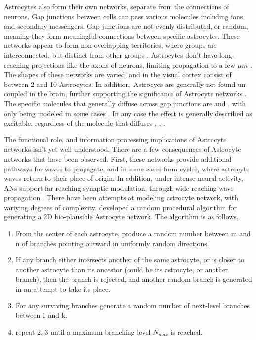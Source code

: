     Astrocytes also form their own networks, separate from the connections of
    neurons. Gap junctions between cells can pass various molecules including
    ions and secondary messengers. Gap junctions are not evenly distributed, or
    random, meaning they form meaningful connections between specific
    astrocytes. These networks appear to form non-overlapping territories, where
    groups are interconnected, but distinct from other
    groups \cite{mederos_2018}. Astrocytes don't have long-reaching
    projections like the axons of neurons, limiting \ca propagation to a few
    $\mu m$ \cite{hofer_2002}. The shapes of these networks are varied,
    and in the visual cortex consist of between 2 and 10 Astrocytes. In
    addition, Astrocyes are generally not found un-coupled in the brain, further
    supporting the significance of Astrocyte networks \cite{postnov_2009}. The
    specific molecules that generally diffuse across gap junctions are \ipt and
    \ca, with only \ipt being modeled in some cases \cite{pitta_2012}. In any
    case the effect is generally described as excitable, regardless of the
    molecule that diffuses \cite{gordleeva_2021}, \cite{pitta_2012},
    \cite{postnov_2009}.

    The functional role, and information processing implications of Astrocyte
    networks isn't yet well understood. There are a few consequences of
    Astrocyte networks that have been observed. First, these
    networks provide additional pathways for \ca waves to propagate, and in
    some cases form cycles, where astrocyte waves return to their place of
    origin. In addition, under intense neural activity, ANs support far reaching
    synaptic modulation, through wide reaching \ca wave propagation \cite{postnov_2009}. There have been attempts at
    modeling astrocyte network, with variying degrees of
    complexity. \parencite{postnov_2009} developed a random procedural algorithm for
    generating a 2D bio-plausible Astrocyte network. The algorithm is as follows,

    \begin{enumerate}
        \item From the center of each astrocyte, produce a random number between
          m and n of branches pointing outward in uniformly random directions.
        \item If any branch either intersects another of the same astrocyte, or
          is closer to another astrocyte than its ancestor (could be its
          astrocyte, or another branch), then the branch is rejected, and
          another random branch is generated in an attempt to take its place.
        \item For any surviving branches generate a random number of next-level
          branches between 1 and k.
        \item repeat 2, 3 until a maximum branching level $N_{max}$ is reached.
    \end{enumerate}

